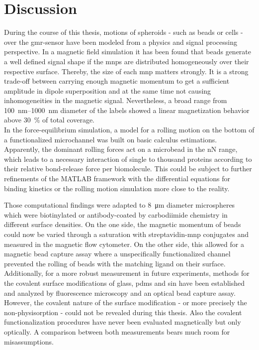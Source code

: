 \chapter{Discussion}
During the course of this thesis, motions of spheroids - such as beads or cells - over the \gls{gmr}-sensor have been modeled from a physics and signal processing perspective. In a magnetic field simulation it has been found that beads generate a well defined signal shape if the \glspl{mnp} are distributed homogeneously over their respective surface. Thereby, the size of each \gls{mnp} matters strongly. It is a strong trade-off between carrying enough magnetic momentum to get a sufficient amplitude in dipole superposition and at the same time not causing inhomogeneities in the magnetic signal. Nevertheless, a broad range from \SIrange{100}{1000}{\nano\meter} diameter of the labels showed a linear magnetization behavior above \SI{30}{\percent} of total coverage.\\
In the force-equilibrium simulation, a model for a rolling motion on the bottom of a functionalized microchannel was built on basic calculus estimations. Apparently, the dominant rolling forces act on a microbead in the \si{\nano\newton} range, which leads to a necessary interaction of single to thousand proteins according to their relative bond-release force per biomolecule. This could be subject to further refinements of the MATLAB framework with the differential equations for binding kinetics \cite{lit:bio:BindingModeling} or the rolling motion simulation more close to the reality. 

Those computational findings were adapted to \SI{8}{\micro\meter} diameter microspheres which were biotinylated or antibody-coated by carbodiimide chemistry in different surface densities. On the one side, the magnetic momentum of beads could now be varied through a saturation with streptavidin-\gls{mnp} conjugates and measured in the magnetic flow cytometer. On the other side, this allowed for a magnetic bead capture assay where a unspecifically functionalized channel prevented the rolling of beads with the matching ligand on their surface. Additionally, for a more robust measurement in future experiments, methods for the covalent surface modifications of glass, \gls{pdms} and \gls{sin} have been established and analyzed by fluorescence microscopy and an optical bead capture assay.\\
However, the covalent nature of the surface modification - or more precisely the non-physisorption - could not be revealed during this thesis. Also the covalent functionalization procedures have never been evaluated magnetically but only optically. A comparison between both measurements bears much room for misassumptions.

